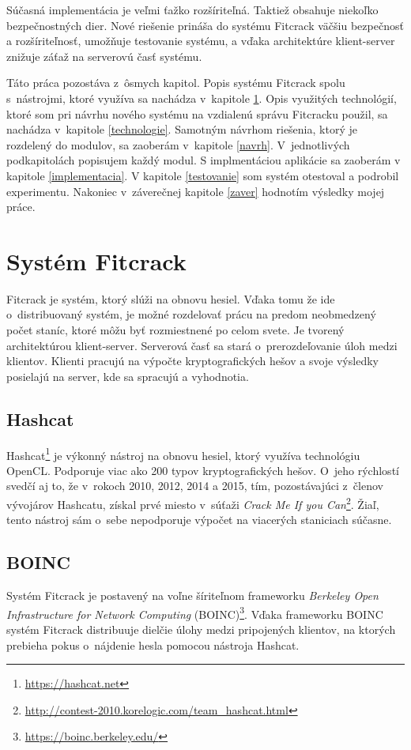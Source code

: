 \documentclass[slovak]{fitthesis}
\begin{document}
Súčasná implementácia je veľmi ťažko rozšíriteľná. Taktiež obsahuje niekoľko bezpečnostných dier. Nové riešenie prináša do systému Fitcrack väčšiu bezpečnosť a rozšíriteľnosť, umožňuje testovanie systému, a vďaka architektúre klient-server znižuje záťaž na serverovú časť systému.

Táto práca pozostáva z~ôsmych kapitol. Popis systému Fitcrack spolu s~nástrojmi, ktoré využíva sa nachádza v~kapitole \ref{Fitcrack}. Opis využitých technológií, ktoré som pri návrhu nového systému na vzdialenú správu Fitcracku použil, sa nachádza v~kapitole \ref{technologie}. Samotným návrhom riešenia, ktorý je rozdelený do modulov, sa zaoberám v~kapitole \ref{navrh}. V~jednotlivých podkapitolách popisujem každý modul. S implmentáciou aplikácie sa zaoberám v kapitole \ref{implementacia}. V kapitole \ref{testovanie} som systém otestoval a podrobil experimentu. Nakoniec v~záverečnej kapitole \ref{zaver} hodnotím výsledky mojej práce. 



\chapter{Systém Fitcrack}\label{Fitcrack}
Fitcrack je systém, ktorý slúži na obnovu hesiel. Vďaka tomu že ide o~distribuovaný systém, je možné rozdelovať prácu na predom neobmedzený počet staníc, ktoré môžu byť rozmiestnené po celom svete. Je tvorený  architektúrou klient-server. Serverová časť sa stará o~prerozdeľovanie úloh medzi klientov. Klienti pracujú na výpočte kryptografických hešov a svoje výsledky posielajú na server, kde sa spracujú a vyhodnotia.
\cite{fitcrackSprava}


\section{Hashcat}\label{hashcat}
Hashcat\footnote{\url{https://hashcat.net}} je výkonný nástroj na obnovu hesiel, ktorý využíva technológiu OpenCL. Podporuje viac ako 200 typov kryptografických hešov. O~jeho rýchlostí svedčí aj to, že v~rokoch 2010, 2012, 2014 a 2015, tím, pozostávajúci z~členov vývojárov Hashcatu, získal prvé miesto v~súťaži \textit{Crack Me If you Can}\footnote{\url{http://contest-2010.korelogic.com/team_hashcat.html}}. Žiaľ, tento nástroj sám o~sebe nepodporuje výpočet na viacerých staniciach súčasne.


\section{BOINC} \label{BOINC}
Systém Fitcrack je postavený na voľne šíriteľnom frameworku \textit{Berkeley Open Infrastructure for Network Computing} (BOINC)\footnote{\url{https://boinc.berkeley.edu/}}. Vďaka frameworku BOINC systém Fitcrack distribuuje dielčie úlohy medzi pripojených klientov, na ktorých prebieha pokus o~nájdenie hesla pomocou nástroja Hashcat.
\end{document}
